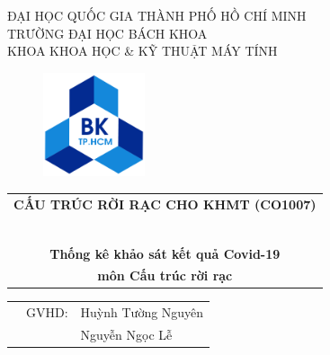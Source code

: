 \documentclass[a4paper]{article}
\theoremstyle{definition}
\begin{document}
	
	\begin{titlepage}
		\begin{center}
			ĐẠI HỌC QUỐC GIA THÀNH PHỐ HỒ CHÍ MINH \\
			TRƯỜNG ĐẠI HỌC BÁCH KHOA \\
			KHOA KHOA HỌC \& KỸ THUẬT MÁY TÍNH 
		\end{center}
		
		\vspace{1cm}
		
		\begin{figure}[h!]
			\begin{center}
				\includegraphics[width=3cm]{Images/hcmut.png}
			\end{center}
		\end{figure}
		
		\vspace{1cm}
		
		
		\begin{center}
			\begin{tabular}{c}
				\multicolumn{1}{l}{\textbf{{\Large CẤU TRÚC RỜI RẠC CHO KHMT (CO1007)}}}\\
				~~\\
				\hline
				\\
				\textbf{\large Thống kê khảo sát kết quả Covid-19}\\
				\textbf{\large môn Cấu trúc rời rạc}
				\\
				\hline
			\end{tabular}
		\end{center}
		
		\vspace{1.5cm}
		
		\begin{table}[h]
			\begin{tabular}{rrl}
				\hspace{5 cm} & GVHD: & Huỳnh Tường Nguyên\\
				\hspace{5 cm} &  & Nguyễn Ngọc Lễ\\
				

\end{tabular}
\end{table}
\end{titlepage}
\end{document}
